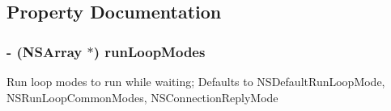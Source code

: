 \subsection{\-Property \-Documentation}
\hypertarget{interface_g_h_async_test_case_a89d630490dbfd03737fb398456d5ed16}{
\subsubsection[{run\-Loop\-Modes}]{\setlength{\rightskip}{0pt plus 5cm}-\/ (\-N\-S\-Array $\ast$) run\-Loop\-Modes}}
\label{interface_g_h_async_test_case_a89d630490dbfd03737fb398456d5ed16}
\-Run loop modes to run while waiting; \-Defaults to \-N\-S\-Default\-Run\-Loop\-Mode, \-N\-S\-Run\-Loop\-Common\-Modes, \-N\-S\-Connection\-Reply\-Mode 

